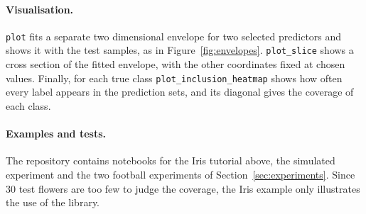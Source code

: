 \paragraph{Visualisation.} \texttt{plot} fits a separate two dimensional envelope for two selected predictors and shows it 
with the test samples, as in Figure~\ref{fig:envelopes}. \texttt{plot\_slice} shows a cross section of the fitted envelope, 
with the other coordinates fixed at chosen values. Finally, for each true class \texttt{plot\_inclusion\_heatmap} shows 
how often every label appears in the prediction sets, and its diagonal gives the coverage of each class.

\paragraph{Examples and tests.} The repository contains notebooks for the Iris tutorial above, the simulated experiment 
and the two football experiments of Section~\ref{sec:experiments}. Since $30$ test flowers are too few to judge the 
coverage, the Iris example only illustrates the use of the library. 